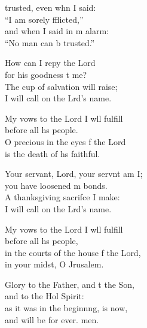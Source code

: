 \settowidth{\versewidth}{in the courts of the house of the Lord,  *}
\begin{psalmverse}%
  \begin{patverse}
     trusted, even whn I said: \Med\\
    “I am sorely fflicted,”\\
    and when I said in m alarm: \Med\\
    “No man can b trusted.”
    
    How can I repy the Lord \Med\\
    for his goodness t me?\\
    The cup of salvation  will raise; \Med\\
    I will call on the Lrd’s name.
    
    My vows to the Lord I w\pointup{\i}ll fulfill \Med\\
    before all h\pointup{\i}s people.\\
    O precious in the eyes f the Lord \Med\\
    is the death of h\pointup{\i}s faithful.

    Your servant, Lord, your servnt am I; \Med\\
    you have loosened m bonds.\\
    A thanksgiving sacrif\pointup{\i}ce I make: \Med\\
    I will call on the Lrd’s name.

    My vows to the Lord I w\pointup{\i}ll fulfill \Med\\
    before all h\pointup{\i}s people,\\
    in the courts of the house f the Lord, \Med\\
    in your midst, O Jrusalem.

    Glory to the Father, and t the Son, \Med\\
    and to the Hol Spirit:\\
    as it was in the beginn\pointup{\i}ng, is now, \Med\\
    and will be for ever. men.
  \end{patverse}
\end{psalmverse}

